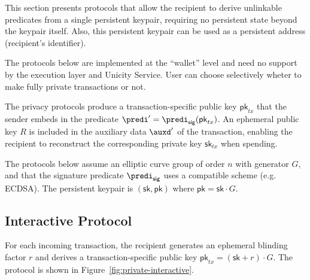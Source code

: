 This section presents protocols that allow the recipient to derive unlinkable predicates from a single persistent keypair, requiring no persistent state beyond the keypair itself. Also, this persistent keypair can be used as a persistent address (recipient's identifier).

The protocols below are implemented at the ``wallet'' level and need no support by the execution layer and Unicity Service. User can choose selectively wheter to make fully private transactions or not.

The privacy protocols produce a transaction-specific public key $\mathsf{pk}_{tx}$ that the sender embeds in the predicate $\predi' = \predi_\mathsf{sig}(\mathsf{pk}_{tx})$. An ephemeral public key $R$ is included in the auxiliary data $\auxd'$ of the transaction, enabling the recipient to reconstruct the corresponding private key $\mathsf{sk}_{tx}$ when spending.

The protocols below assume an elliptic curve group of order $n$ with generator $G$, and that the signature predicate $\predi_\mathsf{sig}$ uses a compatible scheme (e.g. ECDSA). The persistent keypair is $(\mathsf{sk}, \mathsf{pk})$ where $\mathsf{pk} = \mathsf{sk} \cdot G$.

\subsection{Interactive Protocol}\label{sec:private-interactive}

For each incoming transaction, the recipient generates an ephemeral blinding factor $r$ and derives a transaction-specific public key $\mathsf{pk}_{tx} = (\mathsf{sk} + r) \cdot G$. The protocol is shown in Figure~\ref{fig:private-interactive}.

